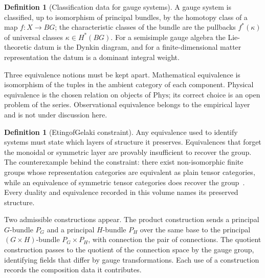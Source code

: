\documentclass[11pt,letterpaper]{article}
\theoremstyle{definition}
\newtheorem{definition}[theorem]{Definition}
\theoremstyle{remark}
\begin{document}
\begin{definition}[Classification data for gauge systems]
\label{def:classdata}
A gauge system is classified, up to isomorphism of principal bundles, by the homotopy class of a map $f: X \to BG$; the characteristic classes of the bundle are the pullbacks $f^*(\kappa)$ of universal classes $\kappa \in H^*(BG)$. For a semisimple gauge algebra the Lie-theoretic datum is the Dynkin diagram, and for a finite-dimensional matter representation the datum is a dominant integral weight.
\end{definition}

Three equivalence notions must be kept apart. Mathematical equivalence is isomorphism of the tuples in the ambient category of each component. Physical equivalence is the chosen relation on objects of $\mathrm{Phys}$; its correct choice is an open problem of the series. Observational equivalence belongs to the empirical layer and is not under discussion here.

\begin{definition}[Etingof\textendash{}Gelaki constraint]
\label{def:etingof-gelaki}
Any equivalence used to identify systems must state which layers of structure it preserves. Equivalences that forget the monoidal or symmetric layer are provably insufficient to recover the group. The counterexample behind the constraint: there exist non-isomorphic finite groups whose representation categories are equivalent as plain tensor categories, while an equivalence of symmetric tensor categories does recover the group~\cite{etingof-gelaki}. Every duality and equivalence recorded in this volume names its preserved structure.
\end{definition}

Two admissible constructions appear. The product construction sends a principal $G$-bundle $P_G$ and a principal $H$-bundle $P_H$ over the same base to the principal $(G \times H)$-bundle $P_G \times P_H$, with connection the pair of connections. The quotient construction passes to the quotient of the connection space by the gauge group, identifying fields that differ by gauge transformations. Each use of a construction records the composition data it contributes.
\end{document}
